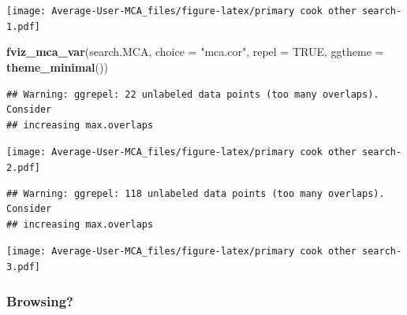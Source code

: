 \documentclass[
]{article}
\newenvironment{Shaded}{\begin{snugshade}}{\end{snugshade}}
\newcommand{\DataTypeTok}[1]{\textcolor[rgb]{0.13,0.29,0.53}{#1}}
\newcommand{\KeywordTok}[1]{\textcolor[rgb]{0.13,0.29,0.53}{\textbf{#1}}}
\newcommand{\NormalTok}[1]{#1}
\newcommand{\OtherTok}[1]{\textcolor[rgb]{0.56,0.35,0.01}{#1}}
\newcommand{\StringTok}[1]{\textcolor[rgb]{0.31,0.60,0.02}{#1}}
\begin{document}
\texttt{[image: Average-User-MCA\_files/figure-latex/primary cook other search-1.pdf]}

\begin{Shaded}
\begin{Highlighting}[]
\KeywordTok{fviz_mca_var}\NormalTok{(search.MCA, }\DataTypeTok{choice =} \StringTok{"mca.cor"}\NormalTok{, }\DataTypeTok{repel =} \OtherTok{TRUE}\NormalTok{,}
             \DataTypeTok{ggtheme =} \KeywordTok{theme_minimal}\NormalTok{())}
\end{Highlighting}
\end{Shaded}

\begin{verbatim}
## Warning: ggrepel: 22 unlabeled data points (too many overlaps). Consider
## increasing max.overlaps
\end{verbatim}

\texttt{[image: Average-User-MCA\_files/figure-latex/primary cook other search-2.pdf]}

\begin{Shaded}
\end{Shaded}

\begin{verbatim}
## Warning: ggrepel: 118 unlabeled data points (too many overlaps). Consider
## increasing max.overlaps
\end{verbatim}

\texttt{[image: Average-User-MCA\_files/figure-latex/primary cook other search-3.pdf]}

\hypertarget{browsing-3}{%
\subsubsection{Browsing?}\label{browsing-3}}
\end{document}

